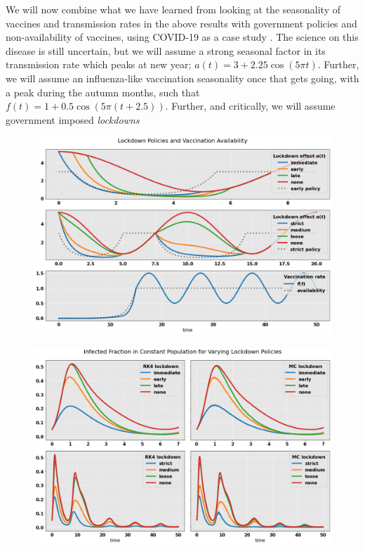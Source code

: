 \documentclass[]{article}
\begin{document}
We will now combine what we have learned from looking at the seasonality of vaccines and transmission rates in the above results with government policies and non-availability of vaccines, using COVID-19 as a case study \cite{who-url}. The science on this disease is still uncertain, but we will assume a strong seasonal factor in its transmission rate which peaks at new year; $a(t) = 3 + 2.25 \cos (5\pi t) $. Further, we will assume an influenza-like vaccination seasonality once that gets going, with a peak during the autumn months, such that $f(t) = 1 + 0.5 \cos (5\pi (t+2.5))$. Further, and critically, we will assume government imposed \textit{lockdowns} 


\begin{figure}[!h]
	\centering
	\includegraphics[width=1\linewidth]{./figs/covid-policy.png}
	\caption{}
	\label{fig:covid-policy}
\end{figure}


\begin{figure}[!h]
	\centering
	\includegraphics[width=1\linewidth]{./figs/covid-infection-sim.png}
	\caption{}
	\label{fig:covid-infection-sim}
\end{figure}
\end{document}
